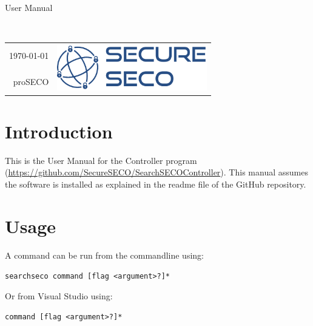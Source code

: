 \documentclass{article}
\def\doctitle{User Manual}
\def\teamname{proSECO}
\begin{document}
\thispagestyle{empty}
\begin{flushright}
\begin{varwidth}{0.6\textwidth}
\begin{flushright}
    \huge\doctitle
\end{flushright}
\end{varwidth}
\\\vspace{0.02\textheight}
\renewcommand{\arraystretch}{1.1}
\begin{tabular}{r l}
    \large\today & \multirow{2}{*}{\includegraphics[height=2cm]{secureseco-logo}} \\
    \large\teamname &  \\
\end{tabular}
\renewcommand{\arraystretch}{1}
\end{flushright}
\vspace{0.04\textheight}


\section{Introduction}
This is the User Manual for the Controller program (\url{https://github.com/SecureSECO/SearchSECOController}). This manual assumes the software is installed as explained in the readme file of the GitHub repository.

\section{Usage}
A command can be run from the commandline using:

\begin{center}
\texttt{searchseco command [flag <argument>?]*} 
\end{center}

Or from Visual Studio using:
\begin{center}
\texttt{command [flag <argument>?]*} 
\end{center}
\end{document}
